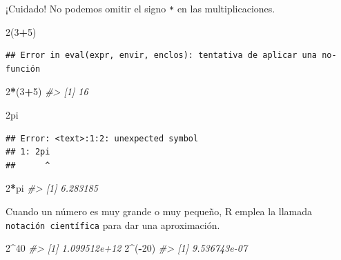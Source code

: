 \documentclass[
]{book}
\newenvironment{Shaded}{\begin{snugshade}}{\end{snugshade}}
\newcommand{\CommentTok}[1]{\textcolor[rgb]{0.56,0.35,0.01}{\textit{#1}}}
\newcommand{\DecValTok}[1]{\textcolor[rgb]{0.00,0.00,0.81}{#1}}
\newcommand{\NormalTok}[1]{#1}
\newcommand{\OperatorTok}[1]{\textcolor[rgb]{0.81,0.36,0.00}{\textbf{#1}}}
\theoremstyle{definition}
\theoremstyle{definition}
\theoremstyle{definition}
\theoremstyle{remark}
\begin{document}
¡Cuidado! No podemos omitir el signo \texttt{*} en las multiplicaciones.

\begin{Shaded}
\begin{Highlighting}[]
\DecValTok{2}\NormalTok{(}\DecValTok{3}\OperatorTok{+}\DecValTok{5}\NormalTok{)}
\end{Highlighting}
\end{Shaded}

\begin{verbatim}
## Error in eval(expr, envir, enclos): tentativa de aplicar una no-función
\end{verbatim}

\begin{Shaded}
\begin{Highlighting}[]
\DecValTok{2}\OperatorTok{*}\NormalTok{(}\DecValTok{3}\OperatorTok{+}\DecValTok{5}\NormalTok{)}
\CommentTok{\#\textgreater{} [1] 16}
\end{Highlighting}
\end{Shaded}

\begin{Shaded}
\begin{Highlighting}[]
\NormalTok{2pi}
\end{Highlighting}
\end{Shaded}

\begin{verbatim}
## Error: <text>:1:2: unexpected symbol
## 1: 2pi
##      ^
\end{verbatim}

\begin{Shaded}
\begin{Highlighting}[]
\DecValTok{2}\OperatorTok{*}\NormalTok{pi}
\CommentTok{\#\textgreater{} [1] 6.283185}
\end{Highlighting}
\end{Shaded}

Cuando un número es muy grande o muy pequeño, R emplea la llamada \texttt{notación\ científica} para dar una aproximación.

\begin{Shaded}
\begin{Highlighting}[]
\DecValTok{2}\OperatorTok{\^{}}\DecValTok{40}
\CommentTok{\#\textgreater{} [1] 1.099512e+12}
\DecValTok{2}\OperatorTok{\^{}}\NormalTok{(}\OperatorTok{{-}}\DecValTok{20}\NormalTok{)}
\CommentTok{\#\textgreater{} [1] 9.536743e{-}07}
\end{Highlighting}
\end{Shaded}
\end{document}
